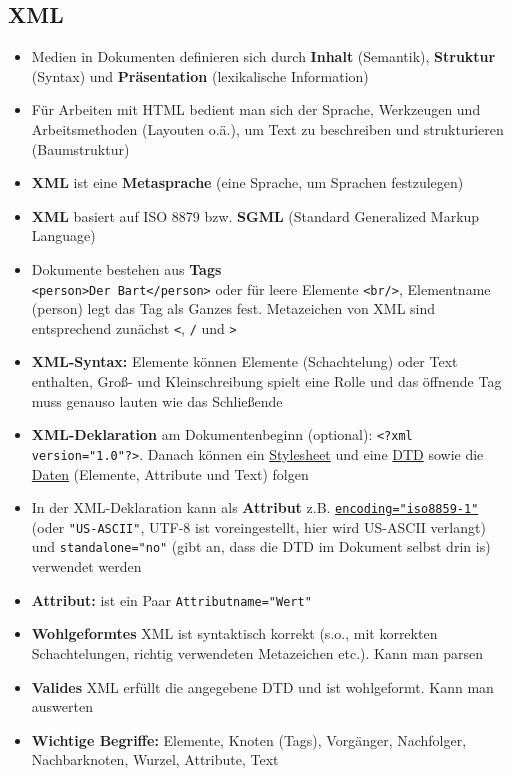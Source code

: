 \documentclass[12pt,landscape]{article}
\def\code#1{\texttt{#1}} %
\begin{document}
\begin{multicols}{3}
\section{XML}
\begin{itemize}
\item Medien in Dokumenten definieren sich durch \textbf{Inhalt} (Semantik), \textbf{Struktur} (Syntax) und \textbf{Präsentation} (lexikalische Information)
\item Für Arbeiten mit HTML bedient man sich der Sprache, Werkzeugen und Arbeitsmethoden (Layouten o.ä.), um Text zu beschreiben und strukturieren (Baumstruktur)
\item \textbf{XML} ist eine \textbf{Metasprache} (eine Sprache, um Sprachen festzulegen)
\item \textbf{XML} basiert auf ISO 8879 bzw. \textbf{SGML} (Standard Generalized Markup Language)
\item Dokumente bestehen aus \textbf{Tags}\\
\lstinline|<person>Der Bart</person>| oder für leere Elemente \lstinline|<br/>|, Elementname (person) legt das Tag als Ganzes fest. Metazeichen von XML sind entsprechend zunächst \code{<}, \code{/} und \code{>}
\item \textbf{XML-Syntax:} Elemente können Elemente (Schachtelung) oder Text enthalten, Groß- und Kleinschreibung spielt eine Rolle und das öffnende Tag muss genauso lauten wie das Schließende
\item \textbf{XML-Deklaration} am Dokumentenbeginn (optional): \lstinline|<?xml version="1.0"?>|. Danach können ein \underline{Stylesheet} und eine \underline{DTD} sowie die \underline{Daten} (Elemente, Attribute und Text) folgen
\item In der XML-Deklaration kann als \textbf{Attribut} z.B. \hyperlink{latin}{\lstinline|encoding="iso8859-1"|} (oder \lstinline|"US-ASCII"|, UTF-8 ist voreingestellt, hier wird US-ASCII verlangt) und \lstinline|standalone="no"| (gibt an, dass die DTD im Dokument selbst drin is) verwendet werden
\item \textbf{Attribut:} ist ein Paar \lstinline|Attributname="Wert"|
\item \textbf{Wohlgeformtes} XML ist syntaktisch korrekt (s.o., mit korrekten Schachtelungen, richtig verwendeten Metazeichen etc.). Kann man parsen
\item \textbf{Valides} XML erfüllt die angegebene DTD und ist wohlgeformt. Kann man auswerten
\item \textbf{Wichtige Begriffe:} Elemente, Knoten (Tags), Vorgänger, Nachfolger, Nachbarknoten, Wurzel, Attribute, Text

\end{itemize}
\end{multicols}
\end{document}

